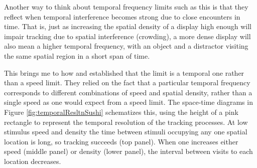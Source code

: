 \documentclass[
]{book}
\begin{document}
Another way to think about temporal frequency limits such as this is that they reflect when temporal interference becomes strong due to close encounters in time. That is, just as increasing the spatial density of a display high enough will impair tracking due to spatial interference (crowding), a more dense display will also mean a higher temporal frequency, with an object and a distractor visiting the same spatial region in a short span of time.

This brings me to how \citet{verstratenLimitsAttentiveTracking2000} and \citet{holcombeSplittingAttentionReduces2013} established that the limit is a temporal one rather than a speed limit. They relied on the fact that a particular temporal frequency corresponds to different combinations of speed and spatial density, rather than a single speed as one would expect from a speed limit. The space-time diagrams in Figure \ref{fig:temporalResltnSushi} schematizes this, using the height of a pink rectangle to represent the temporal resolution of the tracking processes. At low stimulus speed and density the time between stimuli occupying any one spatial location is long, so tracking succeeds (top panel). When one increases either speed (middle panel) or density (lower panel), the interval between visits to each location decreases.
\end{document}
